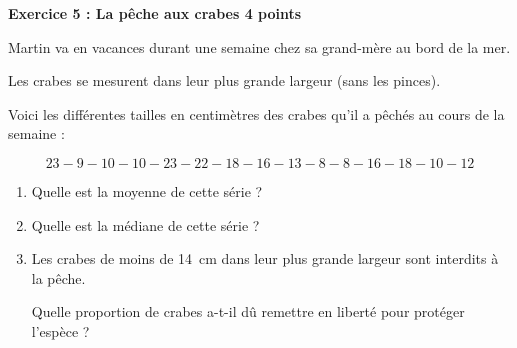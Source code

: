 \textbf{Exercice 5 : La pêche aux crabes \hfill 4 points}

\medskip

Martin va en vacances durant une semaine chez sa grand-mère
au bord de la mer.

Les crabes se mesurent dans leur plus grande largeur (sans les pinces).

Voici les différentes tailles en centimètres des crabes qu'il a
pêchés au cours de la semaine :

\[23 - 9 - 10 - 10 - 23 - 22 - 18 - 16 - 13 - 8 - 8 - 16 - 18 - 10 - 12\]

\begin{enumerate}
\item Quelle est la moyenne de cette série ?
\item Quelle est la médiane de cette série ?
\item Les crabes de moins de 14~cm dans leur plus grande largeur sont interdits à la pêche. 

Quelle proportion de crabes a-t-il dû remettre en liberté pour protéger l'espèce ?
\end{enumerate}

\vspace{0,5cm}

